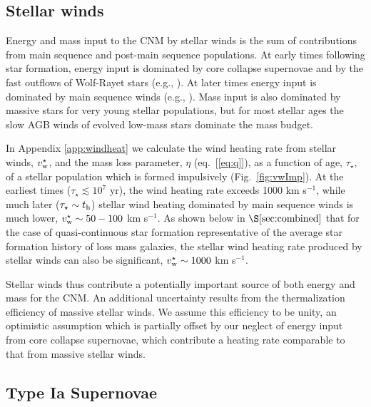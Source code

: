 \documentclass[usenatbib,fleqn]{mn2e}
\begin{document}
\subsection{Stellar winds} 

Energy and mass input to the CNM by stellar winds is the sum of contributions from main sequence and post-main sequence populations.  At early times following star formation, energy input is dominated by core collapse supernovae and by the fast outflows of Wolf-Rayet stars (e.g., \citealt{VossDiehl+:2009a}).  At later times energy input is dominated by main sequence winds (e.g., \citealt{NaimanSoares-Furtado+:2013a}).  Mass input is also dominated by massive stars for very young stellar populations, but for most stellar ages the slow AGB winds of evolved low-mass stars dominate the mass budget.  

In Appendix \ref{app:windheat} we calculate the wind heating rate from
stellar winds, $v_{\rm w}^{\star}$, and the mass loss parameter,
$\eta$ (eq.~[\ref{eq:q}]), as a function of age, $\tau_{\star}$, of a
stellar population which is formed impulsively (Fig.~\ref{fig:vwImp}).  
At the earliest times ($\tau_{\star} \lesssim 10^{7}$ yr), the wind
heating rate exceeds 1000 km s$^{-1}$, while much later ($\tau_{\star}
\sim t_{\rm h}$) stellar wind heating dominated by main sequence winds
is much lower, $v^{\star}_{\rm w} \sim 50-100 $ km s$^{-1}$.  As shown below in $\S\ref{sec:combined}$ that for the case of quasi-continuous star
formation representative of the average star formation history of loss
mass galaxies, the stellar wind heating rate produced by stellar winds
can also be significant, $v_{\rm w}^{\star} \sim 1000$ km s$^{-1}$.  

Stellar winds thus contribute a potentially important source of both
energy and mass for the CNM.  An additional uncertainty results from the thermalization efficiency of massive stellar winds.  We assume this efficiency to be unity, an optimistic assumption which is partially offset by our neglect of energy input from core collapse supernovae, which contribute a heating rate comparable to that from massive stellar winds.  

\subsection{Type Ia Supernovae} 
\end{document}
